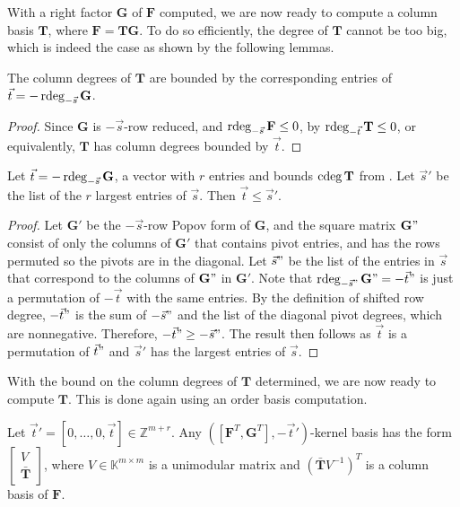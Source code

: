 With a right factor $\mathbf{G}$ of $\mathbf{F}$ computed, we are
now ready to compute a column basis $\mathbf{T}$, where $\mathbf{F}=\mathbf{T}\mathbf{G}$.
To do so efficiently, the degree of $\mathbf{T}$ cannot be too big,
which is indeed the case as shown by the following lemmas.
\begin{lem}
\label{lem:colBasisdegreeBoundByRdegOfRightFactor}The column degrees
of $\mathbf{T}$ are bounded by the corresponding entries of $\vec{t}=-\rdeg_{-\vec{s}}\mathbf{G}$.\end{lem}
\begin{proof}
Since $\mathbf{G}$ is $-\vec{s}$-row reduced, and $\rdeg_{-\vec{s}}\mathbf{F}\le0$,
by  $\rdeg_{-\vec{t}}\mathbf{T}\le0$,
or equivalently, $\mathbf{T}$ has column degrees bounded by $\vec{t}$.\end{proof}
\begin{lem}
\label{lem:colBasisDegreeBoundByInputDegrees}Let $\vec{t}=-\rdeg_{-\vec{s}}\mathbf{G}$,
a vector with $r$ entries and bounds $\cdeg\mathbf{T}$ from .
Let $\vec{s}'$ be the list of the $r$ largest entries of $\vec{s}$.
Then $\vec{t}\le\vec{s}'$.\end{lem}
\begin{proof}
Let $\mathbf{G}'$ be the $-\vec{s}$-row Popov form of $\mathbf{G}$,
and the square matrix $\mathbf{G}"$ consist of only the columns of
$\mathbf{G}'$ that contains pivot entries, and has the rows permuted
so the pivots are in the diagonal. Let $\vec{s}"$ be the list of
the entries in $\vec{s}$ that correspond to the columns of $\mathbf{G}"$
in $\mathbf{G}'$. Note that $\rdeg_{-\vec{s}"}\mathbf{G}"=-\vec{t}"$
is just a permutation of $-\vec{t}$ with the same entries. By the
definition of shifted row degree, $-\vec{t}"$ is the sum of $-\vec{s}"$
and the list of the diagonal pivot degrees, which are nonnegative.
Therefore, $-\vec{t}"\ge-\vec{s}"$. The result then follows as $\vec{t}$
is a permutation of $\vec{t}"$ and $\vec{s}'$ has the largest entries
of $\vec{s}$.
\end{proof}
With the bound on the column degrees of $\mathbf{T}$ determined,
we are now ready to compute $\mathbf{T}$. This is done again using
an order basis computation.
\begin{lem}
Let $\vec{t}'=\left[0,\dots,0,\vec{t}\right]\in\mathbb{Z}^{m+r}$.
Any $\left(\left[\mathbf{F}^{T},\mathbf{G}^{T}\right],-\vec{t}'\right)$-kernel
basis has the form $\begin{bmatrix}V\\
\bar{\mathbf{T}}
\end{bmatrix}$, where $V\in\mathbb{K}^{m\times m}$ is a unimodular matrix and $\left(\bar{\mathbf{T}}V^{-1}\right)^{T}$
is a column basis of $\mathbf{F}$.\end{lem}
